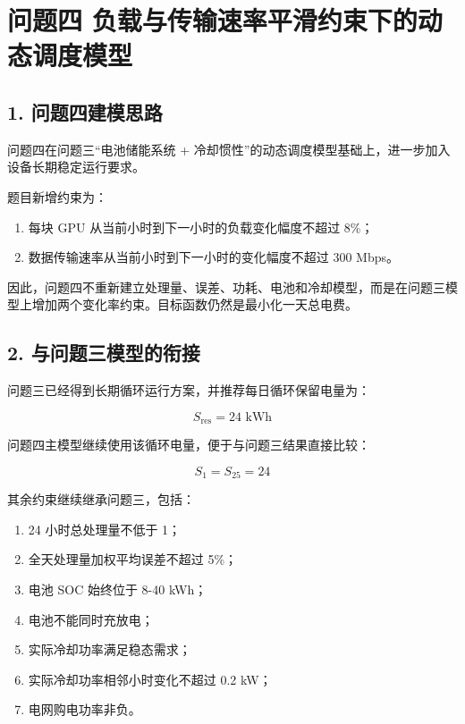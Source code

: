 \documentclass[
]{article}
\author{}
\date{}
\begin{document}
\section{问题四
负载与传输速率平滑约束下的动态调度模型}\label{ux95eeux9898ux56db-ux8d1fux8f7dux4e0eux4f20ux8f93ux901fux7387ux5e73ux6ed1ux7ea6ux675fux4e0bux7684ux52a8ux6001ux8c03ux5ea6ux6a21ux578b}

\subsection{1.
问题四建模思路}\label{1-ux95eeux9898ux56dbux5efaux6a21ux601dux8def}

问题四在问题三``电池储能系统 +
冷却惯性''的动态调度模型基础上，进一步加入设备长期稳定运行要求。

题目新增约束为：

\begin{enumerate}
\def\labelenumi{\arabic{enumi}.}
\item
  每块 GPU 从当前小时到下一小时的负载变化幅度不超过 8\%；
\item
  数据传输速率从当前小时到下一小时的变化幅度不超过 300 Mbps。
\end{enumerate}

因此，问题四不重新建立处理量、误差、功耗、电池和冷却模型，而是在问题三模型上增加两个变化率约束。目标函数仍然是最小化一天总电费。

\subsection{2.
与问题三模型的衔接}\label{2-ux4e0eux95eeux9898ux4e09ux6a21ux578bux7684ux8854ux63a5}

问题三已经得到长期循环运行方案，并推荐每日循环保留电量为：

\[S_{\text{res}}=24\text{ kWh}\]

问题四主模型继续使用该循环电量，便于与问题三结果直接比较：

\[S_1=S_{25}=24\]

其余约束继续继承问题三，包括：

\begin{enumerate}
\def\labelenumi{\arabic{enumi}.}
\item
  24 小时总处理量不低于 1；
\item
  全天处理量加权平均误差不超过 5\%；
\item
  电池 SOC 始终位于 8-40 kWh；
\item
  电池不能同时充放电；
\item
  实际冷却功率满足稳态需求；
\item
  实际冷却功率相邻小时变化不超过 0.2 kW；
\item
  电网购电功率非负。
\end{enumerate}
\end{document}
